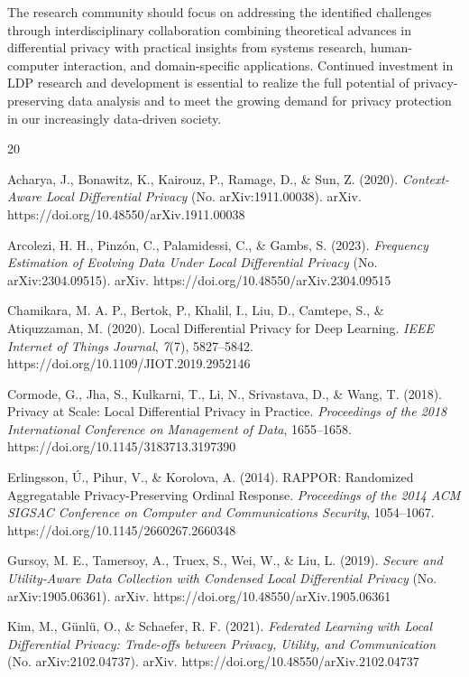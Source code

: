 \documentclass[conference]{IEEEtran}
\begin{document}
The research community should focus on addressing the identified challenges through interdisciplinary collaboration combining theoretical advances in differential privacy with practical insights from systems research, human-computer interaction, and domain-specific applications. Continued investment in LDP research and development is essential to realize the full potential of privacy-preserving data analysis and to meet the growing demand for privacy protection in our increasingly data-driven society.

\begin{thebibliography}{20}

Acharya, J., Bonawitz, K., Kairouz, P., Ramage, D., \& Sun, Z. (2020). \emph{Context-Aware Local Differential Privacy} (No. arXiv:1911.00038). arXiv. https://doi.org/10.48550/arXiv.1911.00038

Arcolezi, H. H., Pinzón, C., Palamidessi, C., \& Gambs, S. (2023). \emph{Frequency Estimation of Evolving Data Under Local Differential Privacy} (No. arXiv:2304.09515). arXiv. https://doi.org/10.48550/arXiv.2304.09515

Chamikara, M. A. P., Bertok, P., Khalil, I., Liu, D., Camtepe, S., \& Atiquzzaman, M. (2020). Local Differential Privacy for Deep Learning. \emph{IEEE Internet of Things Journal}, \emph{7}(7), 5827--5842. https://doi.org/10.1109/JIOT.2019.2952146

Cormode, G., Jha, S., Kulkarni, T., Li, N., Srivastava, D., \& Wang, T. (2018). Privacy at Scale: Local Differential Privacy in Practice. \emph{Proceedings of the 2018 International Conference on Management of Data}, 1655--1658. https://doi.org/10.1145/3183713.3197390

Erlingsson, Ú., Pihur, V., \& Korolova, A. (2014). RAPPOR: Randomized Aggregatable Privacy-Preserving Ordinal Response. \emph{Proceedings of the 2014 ACM SIGSAC Conference on Computer and Communications Security}, 1054--1067. https://doi.org/10.1145/2660267.2660348

Gursoy, M. E., Tamersoy, A., Truex, S., Wei, W., \& Liu, L. (2019). \emph{Secure and Utility-Aware Data Collection with Condensed Local Differential Privacy} (No. arXiv:1905.06361). arXiv. https://doi.org/10.48550/arXiv.1905.06361

Kim, M., Günlü, O., \& Schaefer, R. F. (2021). \emph{Federated Learning with Local Differential Privacy: Trade-offs between Privacy, Utility, and Communication} (No. arXiv:2102.04737). arXiv. https://doi.org/10.48550/arXiv.2102.04737


\end{thebibliography}
\end{document}
